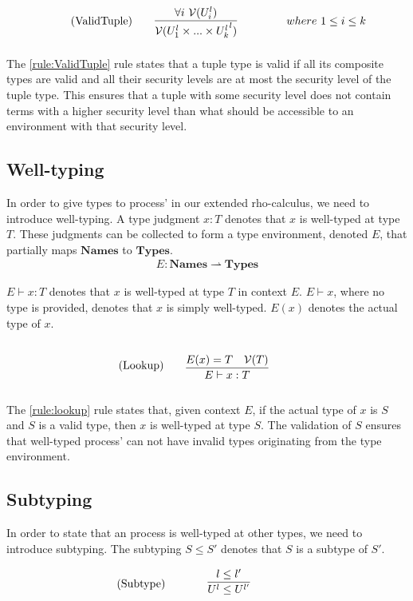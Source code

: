 \begin{align*}
    \tag{ValidTuple}\label{rule:ValidTuple} &\infrule{\forall i\ \valid{U_i^l}}{\valid{{U_1^l \times...\times U_k^l}^l}}& where\ 1\leq i\leq k
\end{align*}
The \ref{rule:ValidTuple} rule states that a tuple type is valid if all its composite types are valid and all their security levels are at most the security level of the tuple type.
This ensures that a tuple with some security level does not contain terms with a higher security level than what should be accessible to an environment with that security level.

\subsection{Well-typing}
In order to give types to process' in our extended rho-calculus, we need to introduce well-typing.
A type judgment $x:T$ denotes that $x$ is well-typed at type $T$.
These judgments can be collected to form a type environment, denoted $E$, that partially maps $\mathbf{Names}$ to $\mathbf{Types}$.
\begin{align*}
    E: \mathbf{Names} \rightharpoonup \mathbf{Types}
\end{align*}

\noindent $E\vdash x:T$ denotes that $x$ is well-typed at type $T$ in context $E$.
$E\vdash x$, where no type is provided, denotes that $x$ is simply well-typed.
$E(x)$ denotes the actual type of $x$.

\begin{align*}
    \tag{Lookup}\label{rule:lookup} &\infrule{E(x)=T\quad\valid{T}}{E\vdash x:T}
\end{align*}

The \ref{rule:lookup} rule states that, given context $E$, if the actual type of $x$ is $S$ and $S$ is a valid type, then $x$ is well-typed at type $S$.
The validation of $S$ ensures that well-typed process' can not have invalid types originating from the type environment.

\subsection{Subtyping}
In order to state that an process is well-typed at other types, we need to introduce subtyping.
The subtyping $S\leq S'$ denotes that $S$ is a subtype of $S'$. 

\begin{align*}
    \tag{Subtype}\label{rule:subtype} &\infrule{l\leq l'}{U^l\leq U^{l'}}
\end{align*}

